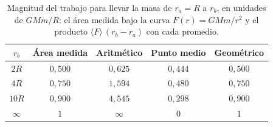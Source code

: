\begin{table}[htbp]
  \centering
  \caption{Magnitud del trabajo para llevar la masa de $r_{a} = R$ a
    $r_{b}$, en unidades de $GMm/R$: el área medida bajo la curva
    $F(r) = GMm/r^{2}$ y el producto $\langle F\rangle\,(r_{b} - r_{a})$ con
    cada promedio.}
  \label{tab:promedios_fuerza}
  \begin{tabular}{@{}ccccc@{}}
    \toprule
    $r_{b}$ & Área medida & Aritmético & Punto medio & Geométrico \\
    \midrule
    $2R$      & $0{,}500$ & $0{,}625$ & $0{,}444$ & $0{,}500$ \\
    $4R$      & $0{,}750$ & $1{,}594$ & $0{,}480$ & $0{,}750$ \\
    $10R$     & $0{,}900$ & $4{,}545$ & $0{,}298$ & $0{,}900$ \\
    $\infty$  & $1$       & $\infty$  & $0$       & $1$       \\
    \bottomrule
  \end{tabular}
\end{table}

